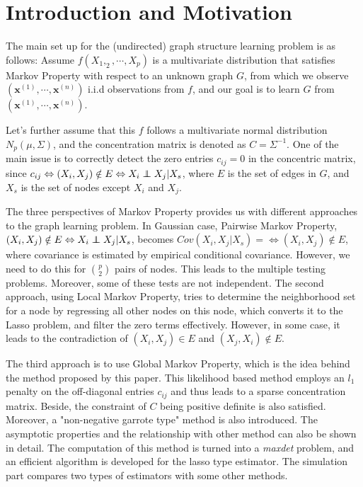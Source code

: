 
\color{SaddleBrown} %

\section*{Introduction and Motivation}

The main set up for the (undirected) graph structure learning problem is as follows: Assume $f(X_1, _2, \cdots, X_p)$ is a multivariate distribution that satisfies Markov Property with respect to an unknown graph $G$, from which we observe $(\mathbf{x}^{(1)}, \cdots, \mathbf{x}^{(n)})$ i.i.d observations from $f$, and our goal is to learn $G$ from $(\mathbf{x}^{(1)}, \cdots, \mathbf{x}^{(n)})$. 

Let's further assume that this $f$ follows a multivariate normal distribution $N_p(\mu, \Sigma)$, and the concentration matrix is denoted as $C = \Sigma^{-1}$. One of the main issue is to correctly detect the zero entries $c_{ij} = 0$ in the concentric matrix, since $c_{ij} \Leftrightarrow (X_i, X_j) \notin E \Leftrightarrow X_i \independent X_j | X_s$, where $E$ is the set of edges in $G$, and $X_s$ is the set of nodes except $X_i$ and $X_j$. 

The three perspectives of Markov Property provides us with different approaches to the graph learning problem. In Gaussian case, Pairwise Markov Property, $(X_i, X_j) \notin E \Leftrightarrow X_i \independent X_j | X_s$, becomes $Cov(X_i, X_j | X_s) = \Leftrightarrow (X_i, X_j) \notin E$, where covariance is estimated by empirical conditional covariance. However, we need to do this for ${p \choose 2}$ pairs of nodes. This leads to the multiple testing problems. Moreover, some of these tests are not independent. The second approach, using Local Markov Property, tries to determine the neighborhood set for a node by regressing all other nodes on this node, which converts it to the Lasso problem, and filter the zero terms effectively. However, in some case, it leads to the contradiction of $(X_i, X_j) \in E$ and $(X_j, X_i) \notin E$.

The third approach is to use Global Markov Property, which is the idea behind the method proposed by this paper. This likelihood based method employs an $l_1$ penalty on the off-diagonal entries $c_{ij}$ and thus leads to a sparse concentration matrix. Beside, the constraint of $C$ being positive definite is also satisfied. Moreover, a "non-negative garrote type" method is also introduced. The asymptotic properties and the relationship with other method can also be shown in detail. The computation of this method is turned into a \emph{maxdet} problem, and an efficient algorithm is developed for the lasso type estimator. The simulation part compares two types of estimators with some other methods. 